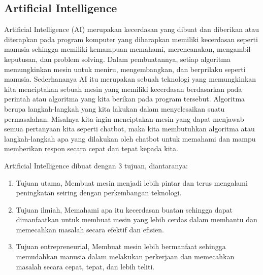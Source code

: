 \subsection{Artificial Intelligence}
Artificial Intelligence (AI) merupakan kecerdasan yang dibuat dan diberikan atau diterapkan pada program komputer yang diharapkan memiliki kecerdasan seperti manusia sehingga memiliki kemampuan memahami, merencanakan, mengambil keputusan, dan problem solving. Dalam pembuatannya, setiap algoritma memungkinkan mesin untuk meniru, mengembangkan, dan berprilaku seperti manusia. Sederhananya AI itu merupakan sebuah teknologi yang memungkinkan kita menciptakan sebuah mesin yang memiliki kecerdasan berdasarkan pada perintah atau algoritma yang kita berikan pada program tersebut. Algoritma berupa langkah-langkah yang kita lakukan dalam menyelesaikan suatu permasalahan. Misalnya kita ingin menciptakan mesin yang dapat menjawab semua pertanyaan kita seperti chatbot, maka kita membutuhkan algoritma atau langkah-langkah apa yang dilakukan oleh chatbot untuk memahami dan mampu memberikan respon secara cepat dan tepat kepada kita.

Artificial Intelligence dibuat dengan 3 tujuan, diantaranya:
\begin{enumerate}
\item Tujuan utama, Membuat mesin menjadi lebih pintar dan terus mengalami peningkatan seiring dengan perkembangan teknologi.
\item Tujuan ilmiah, Memahami apa itu kecerdasan buatan sehingga dapat dimanfaatkan untuk membuat mesin yang lebih cerdas dalam membantu dan memecahkan masalah secara efektif dan efisien.
\item Tujuan entrepreneurial, Membuat mesin lebih bermanfaat sehingga memudahkan manusia dalam melakukan perkerjaan dan memecahkan masalah secara cepat, tepat, dan lebih teliti.
\end{enumerate}


